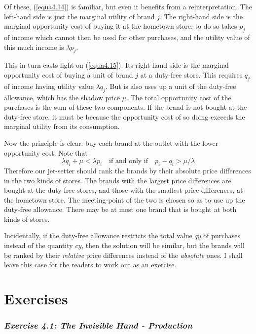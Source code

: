 Of these, (\ref{equa4.14}) is familiar, but even it benefits from a reinterpretation. The left-hand side is just the marginal utility of brand $j$. The right-hand side is the marginal opportunity cost of buying it at the hometown store: to do so takes $p_j$ of income which cannot then be used for other purchases, and the utility value of this much income is $\lambda p_j$.

This in turn casts light on (\ref{equa4.15}). Its right-hand side is the marginal opportunity cost of buying a unit of brand $j$ at a duty-free store. This requires $q_j$ of income having utility value $\lambda q_j$. But is also uses up a unit of the duty-free allowance, which has the shadow price $\mu$. The total opportunity cost of the purchases is the sum of these two components. If the brand is not bought at the duty-free store, it must be because the opportunity cost of so doing exceeds the marginal utility from its consumption.

Now the principle is clear: buy each brand at the outlet with the lower opportunity cost. Note that
\begin{equation*}
  \lambda q_i +\mu < \lambda p_i   \quad \mbox{if and only if} \quad p_i -q_i > \mu / \lambda
\end{equation*}
Therefore our jet-setter should rank the brands by their absolute price differences in the two kinds of stores. The brands with the largest price differences are bought at the duty-free stores, and those with the smallest price differences, at the hometown store. The meeting-point of the two is chosen so as to use up the duty-free allowance. There may be at most one brand that is bought at both kinds of stores.

Incidentally, if the duty-free allowance restricts the total value $qy$ of purchases instead of the quantity $cy$, then the solution will be similar, but the brands will be ranked by their \textit{relative} price differences instead of the \textit{absolute} ones. I shall leave this case for the readers to work out as an exercise.

\section*{Exercises}

\subsubsection*{\textit{Exercise 4.1: The Invisible Hand - Production}}

